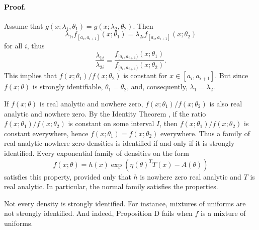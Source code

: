 \documentclass[english]{article}
\begin{document}
\paragraph{Proof.}
Assume that $g(x;\lambda_{1},\theta_{1})=g(x;\lambda_{2},\theta_{2})$.
Then $$\lambda_{1i}f_{[a_{i},a_{i+1}]}(x;\theta_{1})=\lambda_{2i}f_{[a_{i},a_{i+1}]}(x;\theta_{2})$$
for all $i$, thus
\[
\frac{\lambda_{1i}}{\lambda_{2i}}=\frac{f_{[a_{i},a_{i+1})}(x;\theta_{1})}{f_{[a_{i},a_{i+1})}(x;\theta_{2})}.
\]
This implies that $f(x;\theta_{1})/f(x;\theta_{2})$ is constant for
$x\in[a_{i},a_{i+1}]$. But since $f(x;\theta)$ is strongly identifiable,
$\theta_{1}=\theta_{2}$, and, consequently, $\lambda_1 = \lambda_2$.


If $f(x;\theta)$ is real analytic and nowhere zero, $f(x;\theta_{1})/f(x;\theta_{2})$
is also real analytic and nowhere zero. By the Identity Theorem \citep[Corollary 1.2.6]{Krantz2002-bt}, if the ratio
$f(x;\theta_{1})/f(x;\theta_{2})$ is constant on some interval $I$,
then $f(x;\theta_{1})/f(x;\theta_{2})$ is constant everywhere, hence
$f(x;\theta_{1})=f(x;\theta_{2})$ everywhere. Thus a family of real
analytic nowhere zero densities is identified if and only if it is
strongly identified. Every exponential family of densities on the form
\[
f(x;\theta)=h(x)\exp(\eta(\theta)^{T}T(x)-A(\theta))
\]
satisfies this property, provided only that $h$ is nowhere zero real analytic
and $T$ is real analytic. In particular, the normal family satisfies
the properties.

Not every density is strongly identified. For instance, mixtures of uniforms are not strongly identified. And indeed, Proposition D fails when $f$ is a mixture of uniforms.



\end{document}
